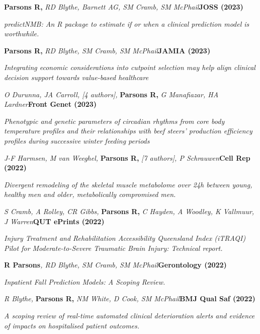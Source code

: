 \item
    \textbf{Parsons R, }\textit{RD Blythe, Barnett AG, SM Cramb, SM McPhail}\textbf{\hfill{JOSS (2023)}}\par
    \textit{predictNMB: An R package to estimate if or when a clinical prediction model is worthwhile.}
\item
    \textbf{Parsons R, }\textit{RD Blythe, SM Cramb, SM McPhail}\textbf{\hfill{JAMIA (2023)}}\par
    \textit{
        Integrating economic considerations into cutpoint selection may help align clinical decision support \newline
        towards value-based healthcare
    }
\item
    \textit{O Durunna, JA Carroll, [4 authors], }\textbf{Parsons R, }\textit{G Manafiazar, HA Lardner}\textbf{\hfill{Front Genet (2023)}}\par
    \textit{
        Phenotypic and genetic parameters of circadian rhythms from core body temperature profiles and \newline
        their relationships with beef steers’ production efficiency profiles during successive winter feeding periods
    }
\item
    \textit{J-F Harmsen, M van Weeghel, }\textbf{Parsons R, }\textit{[7 authors], P Schrauwen}\textbf{\hfill{Cell Rep (2022)}}\par
    \textit{
        Divergent remodeling of the skeletal muscle metabolome over 24h between young, healthy men and older,\newline
        metabolically compromised men.
    }
\item
    \textit{S Cramb, A Rolley, CR Gibbs, }\textbf{Parsons R, }\textit{C Hayden, A Woodley, K Vallmuur, J Warren}\textbf{\hfill{QUT ePrints (2022)}}\par
	\textit{
        Injury Treatment and Rehabilitation Accessibility Queensland Index (iTRAQI) Pilot for Moderate-to-Severe \newline
        Traumatic Brain Injury: Technical report.
    }
\item
    \textbf{R Parsons}\textit{, RD Blythe, SM Cramb, SM McPhail}\textbf{\hfill Gerontology (2022)}\par
	\textit{Inpatient Fall Prediction Models: A Scoping Review.}
\item
	\textit{R Blythe, }\textbf{Parsons R, }\textit{NM White, D Cook, SM McPhail}\textbf{\hfill{BMJ Qual Saf (2022)}}\par
	\textit{A scoping review of real-time automated clinical deterioration alerts and evidence of impacts on hospitalised patient outcomes.}

